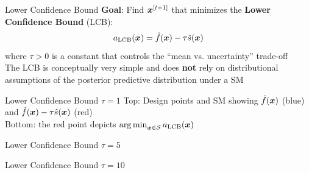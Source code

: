 \documentclass[11pt,compress,t,notes=noshow, xcolor=table]{beamer}
\begin{document}
\begin{framev}{Lower Confidence Bound}
\textbf{Goal}: Find $\bm{x}^{[t+1]}$ that minimizes the \textbf{Lower Confidence Bound} (LCB):
$$
a_{\text{LCB}}(\bm{x}) = \hat{f}(\bm{x}) - \tau \hat{s}(\bm{x})
$$
where $\tau > 0$ is a constant that controls the \enquote{mean vs. uncertainty} trade-off\\
\vfill
The LCB is conceptually very simple and does \textbf{not} rely on distributional assumptions of the posterior predictive distribution under a SM
\end{framev}


\begin{framev}{Lower Confidence Bound}
$\tau = 1$
\vfill
{}
\vfill
Top: Design points and SM showing $\hat{f}(\bm{x})$ (blue) and $\hat{f}(\bm{x}) - \tau \hat{s}(\bm{x})$ (red)\\
Bottom: the red point depicts $\mathop{\mathrm{arg\,min}}_{\bm{x} \in \mathcal{S}} a_{\text{LCB}}(\bm{x})$
\end{framev}


\begin{framev}{Lower Confidence Bound}
$\tau = 5$
\vfill
{}
\end{framev}


\begin{framev}{Lower Confidence Bound}
$\tau = 10$
\vfill
{}
\end{framev}

\endlecture
\end{document}
